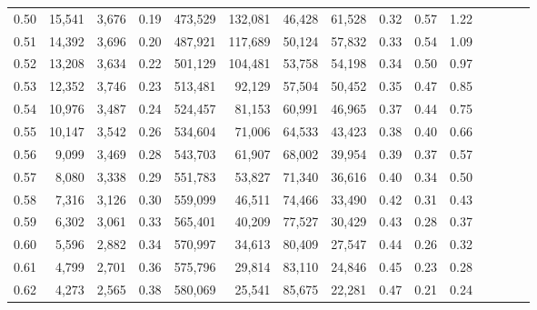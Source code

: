 \begin{tabular}{rrrcrrrrrrrrrrr}
0.50 &  15,541 &  3,676 &                                       0.19 &  473,529 &  132,081 &   46,428 &   61,528 &  0.32 &  0.57 &                         1.22 \\
0.51 &  14,392 &  3,696 &                                       0.20 &  487,921 &  117,689 &   50,124 &   57,832 &  0.33 &  0.54 &                         1.09 \\
0.52 &  13,208 &  3,634 &                                       0.22 &  501,129 &  104,481 &   53,758 &   54,198 &  0.34 &  0.50 &                         0.97 \\
0.53 &  12,352 &  3,746 &                                       0.23 &  513,481 &   92,129 &   57,504 &   50,452 &  0.35 &  0.47 &                         0.85 \\
0.54 &  10,976 &  3,487 &                                       0.24 &  524,457 &   81,153 &   60,991 &   46,965 &  0.37 &  0.44 &                         0.75 \\
0.55 &  10,147 &  3,542 &                                       0.26 &  534,604 &   71,006 &   64,533 &   43,423 &  0.38 &  0.40 &                         0.66 \\
0.56 &   9,099 &  3,469 &                                       0.28 &  543,703 &   61,907 &   68,002 &   39,954 &  0.39 &  0.37 &                         0.57 \\
0.57 &   8,080 &  3,338 &                                       0.29 &  551,783 &   53,827 &   71,340 &   36,616 &  0.40 &  0.34 &                         0.50 \\
0.58 &   7,316 &  3,126 &                                       0.30 &  559,099 &   46,511 &   74,466 &   33,490 &  0.42 &  0.31 &                         0.43 \\
0.59 &   6,302 &  3,061 &                                       0.33 &  565,401 &   40,209 &   77,527 &   30,429 &  0.43 &  0.28 &                         0.37 \\
0.60 &   5,596 &  2,882 &                                       0.34 &  570,997 &   34,613 &   80,409 &   27,547 &  0.44 &  0.26 &                         0.32 \\
0.61 &   4,799 &  2,701 &                                       0.36 &  575,796 &   29,814 &   83,110 &   24,846 &  0.45 &  0.23 &                         0.28 \\
0.62 &   4,273 &  2,565 &                                       0.38 &  580,069 &   25,541 &   85,675 &   22,281 &  0.47 &  0.21 &                         0.24 \\

\end{tabular}
